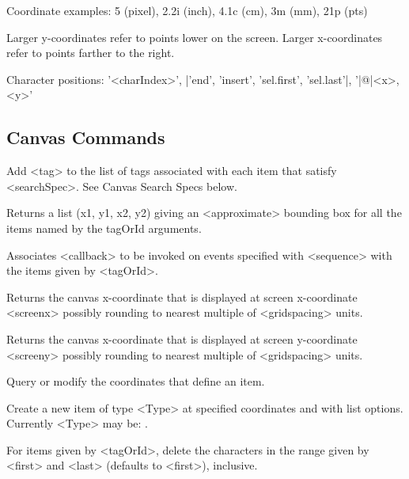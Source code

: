 \vskip5pt
Coordinate examples: 5 (pixel), 2.2i (inch), 4.1c (cm), 3m (mm), 21p (pts)
\begin{enum}{1cm}
\Xi{} Larger y-coordinates refer to points lower on the  screen.
\Xi{} Larger x-coordinates refer to points farther to the right.
\end{enum}

\vskip5pt
Character positions: '<charIndex>', |'end', 'insert', 'sel.first', 'sel.last'|, '|@|<x>,<y>'


\subsection*{Canvas Commands}
\begin{enum}{1cm}

Add <tag> to the list  of tags  associated  with each item that 
satisfy <searchSpec>. See Canvas Search Specs below.

Returns a list (x1, y1, x2, y2) giving an <approximate> bounding  box 
for all the items named by the tagOrId arguments.

Associates <callback> to be invoked on events specified with <sequence>
with the items given by  <tagOrId>.

Returns  the  canvas x-coordinate that is displayed at screen x-coordinate
<screenx> possibly rounding to nearest multiple of <gridspacing> units.

Returns  the  canvas x-coordinate that is displayed at screen y-coordinate
<screeny> possibly rounding to nearest multiple of <gridspacing> units.

Query  or  modify  the  coordinates  that define an item.

Create a new item of type <Type> at specified coordinates and with list
options.  Currently <Type> may be: .

For items given by <tagOrId>, delete the characters in the range given 
by <first> and  <last> (defaults to <first>),  inclusive.


\end{enum}
